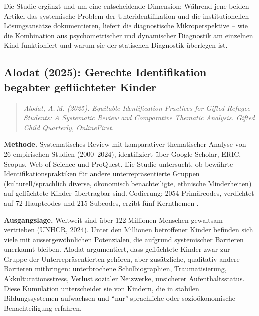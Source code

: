 \documentclass[ngerman, a4paper]{article}
\begin{document}
Die Studie ergänzt \textcite{mun2020identifying} und
\textcite{gubbins2020promising} um eine entscheidende Dimension: Während
jene beiden Artikel das systemische Problem der Unteridentifikation und die
institutionellen Lösungsansätze dokumentieren, liefert
\textcite{alhroub2021utility} die diagnostische Mikroperspektive -- wie die
Kombination aus psychometrischer und dynamischer Diagnostik am einzelnen
Kind funktioniert und warum sie der statischen Diagnostik überlegen ist.


\subsection*{Alodat (2025): Gerechte Identifikation begabter
  geflüchteter Kinder}
\label{subsec:alodat2025}

\begin{quote}\itshape
Alodat, A.\,M. (2025). Equitable Identification Practices for Gifted
Refugee Students: A Systematic Review and Comparative Thematic Analysis.
\upshape Gifted Child Quarterly, OnlineFirst.
\end{quote}

\textbf{Methode.} Systematisches Review mit komparativer thematischer
Analyse von 26 empirischen Studien (2000--2024), identifiziert über Google
Scholar, ERIC, Scopus, Web of Science und ProQuest. Die Studie untersucht,
ob bewährte Identifikationspraktiken für andere unterrepräsentierte Gruppen
(kulturell/sprachlich diverse, ökonomisch benachteiligte, ethnische
Minderheiten) auf geflüchtete Kinder übertragbar sind. Codierung: 2054
Primärcodes, verdichtet auf 72 Hauptcodes und 215 Subcodes, ergibt fünf
Kernthemen \parencite{alodat2025equitable}.

\textbf{Ausgangslage.} Weltweit sind über 122 Millionen Menschen
gewaltsam vertrieben (UNHCR, 2024). Unter den Millionen betroffener Kinder
befinden sich viele mit aussergewöhnlichen Potenzialen, die aufgrund
systemischer Barrieren unerkannt bleiben. Alodat argumentiert, dass
geflüchtete Kinder zwar zur Gruppe der Unterrepräsentierten gehören, aber
zusätzliche, qualitativ andere Barrieren mitbringen: unterbrochene
Schulbiographien, Traumatisierung, Akkulturationsstress, Verlust sozialer
Netzwerke, unsicherer Aufenthaltsstatus. Diese Kumulation unterscheidet
sie von Kindern, die in stabilen Bildungssystemen aufwachsen und
\enquote{nur} sprachliche oder sozioökonomische Benachteiligung erfahren.
\end{document}
